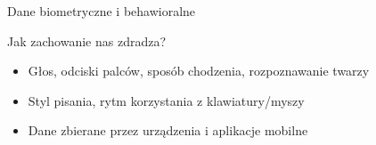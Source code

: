   
  
  
  
  
  \begin{frame}{Dane biometryczne i behawioralne}
    \begin{alertblock}{Jak zachowanie nas zdradza?}
      \begin{itemize}
        \item Głos, odciski palców, sposób chodzenia, rozpoznawanie twarzy
        \item Styl pisania, rytm korzystania z klawiatury/myszy
        \item Dane zbierane przez urządzenia i aplikacje mobilne
      \end{itemize}
    \end{alertblock}
  \end{frame}
  
